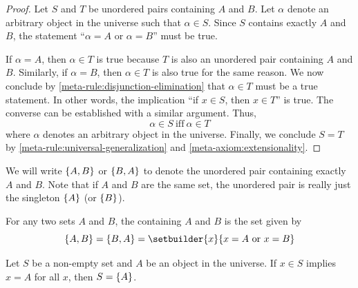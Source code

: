 \begin{proof}
    Let \( S \) and \( T \) be unordered pairs containing \( A \) and \( B \).
    Let \( \alpha \) denote an arbitrary object in the universe such that \( \alpha \in S \).
    Since \( S \) contains exactly \( A \) and \( B \), the statement ``\( \alpha = A \) or \( \alpha = B \)'' must be true.

    \vspace{0.3cm}
    \noindent
    If \( \alpha = A \), then \( \alpha \in T \) is true because \( T \) is also an unordered pair containing \( A \) and \( B \).
    Similarly, if \( \alpha = B \), then \( \alpha \in T \) is also true for the same reason.
    We now conclude by \cref{meta-rule:disjunction-elimination} that \( \alpha \in T \) must be a true statement.
    In other words, the implication ``if \( x \in S \), then \( x \in T \)'' is true.
    The converse can be established with a similar argument.
    Thus,
    \begin{equation*}
        \alpha \in S \ \text{iff} \ \alpha \in T
    \end{equation*}
    where \( \alpha \) denotes an arbitrary object in the universe.
    Finally, we conclude \( S = T \) by \cref{meta-rule:universal-generalization} and \cref{meta-axiom:extensionality}.
\end{proof}

\begin{notation}
    We will write \( \mleft\{ A, B \mright\} \) or \( \mleft\{ B, A \mright\} \) to denote the unordered pair containing exactly \( A \) and \( B \).
    Note that if \( A \) and \( B \) are the same set, the unordered pair is really just the singleton \( \mleft\{ A \mright\} \) (or \( \mleft\{ B \mright\} \)).
\end{notation}

\begin{dfn}
     \label{dfn:metatheory-unordered-pair}
    For any two sets \( A \) and \( B \), the  containing \( A \) and \( B \) is the set given by
    \begin{equation*}
        \mleft\{ A, B \mright\} = \mleft\{ B, A \mright\} = \setbuilder{x}{x = A \ \text{or} \ x = B}
    \end{equation*}
\end{dfn}

\begin{thm}
     \label{thm:metatheory-sufficient-conditions-for-singleton}
    Let \( S \) be a non-empty set and \( A \) be an object in the universe.
    If \( x \in S \) implies \( x = A \) for all \( x \), then \( S = \mleft\{ A \mright\} \).
\end{thm}

